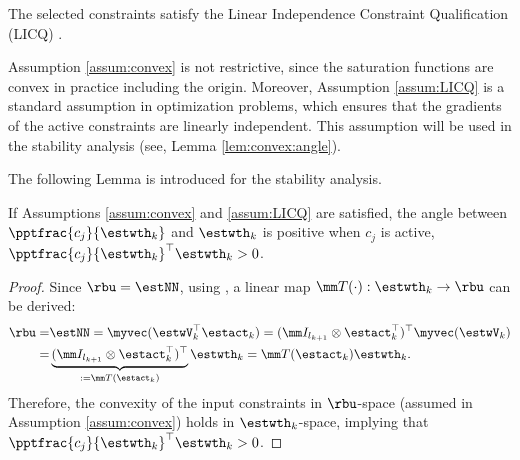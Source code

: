 \documentclass[final,5p,times,twocolumn,authoryear]{elsarticle}
\begin{document}
\begin{assum}
    The selected constraints satisfy the Linear Independence Constraint Qualification (LICQ) \cite[Chap.~12 Def.~12.1]{Nocedal:2006aa}.
    \label{assum:LICQ}
\end{assum}

\begin{remark}
    Assumption \ref{assum:convex} is not restrictive, since the saturation functions are convex in practice including the origin.
    Moreover, Assumption \ref{assum:LICQ} is a standard assumption in optimization problems, which ensures that the gradients of the active constraints are linearly independent.
    This assumption will be used in the stability analysis (see, Lemma \ref{lem:convex:angle}).
\end{remark}

The following Lemma is introduced for the stability analysis.
\begin{lem}
    If Assumptions \ref{assum:convex} and \ref{assum:LICQ} are satisfied, the angle between $\pptfrac{c_j}{\estwth_k}$ and $\estwth_k$ is positive when $c_j$ is active, \ie $\pptfrac{c_j}{\estwth_k}^\top\estwth_k>0$.
    \label{lem:convex:angle}
\end{lem}

\begin{proof}

Since $\rbu = \estNN$, using \cite[Proposition 7.1.9]{Bernstein:2009aa}, a linear map $\mm T(\cdot):\estwth_k\to\rbu$ can be derived: 
\begin{equation}\label{eq:linear:map}
    \begin{aligned}
    \rbu 
    = 
    &
    \estNN 
    =
    \myvec(
        \estwV_k^\top \estact_k
    ) 
    = 
    (
        \mm I_{l_{k+1}}
        \otimes 
        \estact_k^\top
    )^\top
    \myvec(\estwV_k)
    \\
    = &
    \underbrace{
        (
        \mm I_{l_{k+1}}
        \otimes 
        \estact_k^\top
    )^\top}_{:=\mm T(\estact_k)}
    \estwth_k 
    =
    \mm T(\estact_k) \estwth_k.
    \end{aligned}
\end{equation}
Therefore, the convexity of the input constraints in $\rbu$-space (assumed in Assumption \ref{assum:convex}) holds in $\estwth_k$-space, implying
that $\pptfrac{c_j}{\estwth_k}^\top\estwth_k>0$.

\end{proof}
\end{document}
